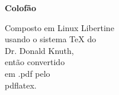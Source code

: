 \vspace*{\fill}
	\begin{flushright}
	{\Large\textbf{Colofão}}

	{\large 
	Composto em Linux Libertine \\
	usando o sistema \TeX{} do \\
	Dr. Donald Knuth, \\
	então convertido \\
	em .pdf pelo \\
	pdflatex. \\}
	\end{flushright}
